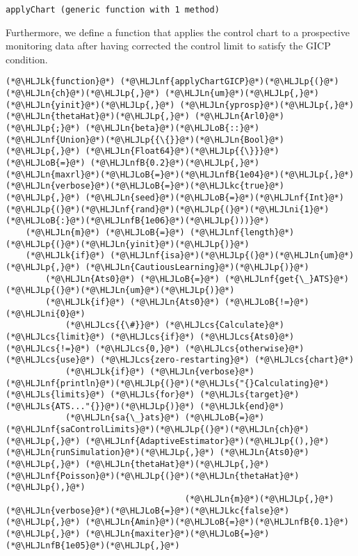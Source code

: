 \documentclass[12pt,a4paper]{article}
\newcommand{\HLJLk}[1]{\textcolor[RGB]{148,91,176}{\textbf{#1}}}
\newcommand{\HLJLkc}[1]{\textcolor[RGB]{59,151,46}{\textit{#1}}}
\newcommand{\HLJLn}[1]{#1}
\newcommand{\HLJLnf}[1]{\textcolor[RGB]{66,102,213}{#1}}
\newcommand{\HLJLs}[1]{\textcolor[RGB]{201,61,57}{#1}}
\newcommand{\HLJLnfB}[1]{\textcolor[RGB]{59,151,46}{#1}}
\newcommand{\HLJLni}[1]{\textcolor[RGB]{59,151,46}{#1}}
\newcommand{\HLJLoB}[1]{\textcolor[RGB]{102,102,102}{\textbf{#1}}}
\newcommand{\HLJLp}[1]{#1}
\newcommand{\HLJLcs}[1]{\textcolor[RGB]{153,153,119}{\textit{#1}}}
\begin{document}
\begin{lstlisting}
applyChart (generic function with 1 method)
\end{lstlisting}


Furthermore, we define a function that applies the control chart to a prospective monitoring data after having corrected the control limit to satisfy the GICP condition.


\begin{lstlisting}
(*@\HLJLk{function}@*) (*@\HLJLnf{applyChartGICP}@*)(*@\HLJLp{(}@*)(*@\HLJLn{ch}@*)(*@\HLJLp{,}@*) (*@\HLJLn{um}@*)(*@\HLJLp{,}@*) (*@\HLJLn{yinit}@*)(*@\HLJLp{,}@*) (*@\HLJLn{yprosp}@*)(*@\HLJLp{,}@*) (*@\HLJLn{thetaHat}@*)(*@\HLJLp{,}@*) (*@\HLJLn{Arl0}@*)(*@\HLJLp{;}@*) (*@\HLJLn{beta}@*)(*@\HLJLoB{::}@*)(*@\HLJLnf{Union}@*)(*@\HLJLp{{\{}}@*)(*@\HLJLn{Bool}@*)(*@\HLJLp{,}@*) (*@\HLJLn{Float64}@*)(*@\HLJLp{{\}}}@*) (*@\HLJLoB{=}@*) (*@\HLJLnfB{0.2}@*)(*@\HLJLp{,}@*) (*@\HLJLn{maxrl}@*)(*@\HLJLoB{=}@*)(*@\HLJLnfB{1e04}@*)(*@\HLJLp{,}@*) (*@\HLJLn{verbose}@*)(*@\HLJLoB{=}@*)(*@\HLJLkc{true}@*)(*@\HLJLp{,}@*) (*@\HLJLn{seed}@*)(*@\HLJLoB{=}@*)(*@\HLJLnf{Int}@*)(*@\HLJLp{(}@*)(*@\HLJLnf{rand}@*)(*@\HLJLp{(}@*)(*@\HLJLni{1}@*)(*@\HLJLoB{:}@*)(*@\HLJLnfB{1e06}@*)(*@\HLJLp{)))}@*)
    (*@\HLJLn{m}@*) (*@\HLJLoB{=}@*) (*@\HLJLnf{length}@*)(*@\HLJLp{(}@*)(*@\HLJLn{yinit}@*)(*@\HLJLp{)}@*)
    (*@\HLJLk{if}@*) (*@\HLJLnf{isa}@*)(*@\HLJLp{(}@*)(*@\HLJLn{um}@*)(*@\HLJLp{,}@*) (*@\HLJLn{CautiousLearning}@*)(*@\HLJLp{)}@*)
        (*@\HLJLn{Ats0}@*) (*@\HLJLoB{=}@*) (*@\HLJLnf{get{\_}ATS}@*)(*@\HLJLp{(}@*)(*@\HLJLn{um}@*)(*@\HLJLp{)}@*)
        (*@\HLJLk{if}@*) (*@\HLJLn{Ats0}@*) (*@\HLJLoB{!=}@*) (*@\HLJLni{0}@*)
            (*@\HLJLcs{{\#}}@*) (*@\HLJLcs{Calculate}@*) (*@\HLJLcs{limit}@*) (*@\HLJLcs{if}@*) (*@\HLJLcs{Ats0}@*) (*@\HLJLcs{!=}@*) (*@\HLJLcs{0,}@*) (*@\HLJLcs{otherwise}@*) (*@\HLJLcs{use}@*) (*@\HLJLcs{zero-restarting}@*) (*@\HLJLcs{chart}@*)
            (*@\HLJLk{if}@*) (*@\HLJLn{verbose}@*) (*@\HLJLnf{println}@*)(*@\HLJLp{(}@*)(*@\HLJLs{"{}Calculating}@*) (*@\HLJLs{limits}@*) (*@\HLJLs{for}@*) (*@\HLJLs{target}@*) (*@\HLJLs{ATS..."{}}@*)(*@\HLJLp{)}@*) (*@\HLJLk{end}@*)
            (*@\HLJLn{sa{\_}ats}@*) (*@\HLJLoB{=}@*) (*@\HLJLnf{saControlLimits}@*)(*@\HLJLp{(}@*)(*@\HLJLn{ch}@*)(*@\HLJLp{,}@*) (*@\HLJLnf{AdaptiveEstimator}@*)(*@\HLJLp{(),}@*) (*@\HLJLn{runSimulation}@*)(*@\HLJLp{,}@*) (*@\HLJLn{Ats0}@*)(*@\HLJLp{,}@*) (*@\HLJLn{thetaHat}@*)(*@\HLJLp{,}@*) (*@\HLJLnf{Poisson}@*)(*@\HLJLp{(}@*)(*@\HLJLn{thetaHat}@*)(*@\HLJLp{),}@*)
                                    (*@\HLJLn{m}@*)(*@\HLJLp{,}@*) (*@\HLJLn{verbose}@*)(*@\HLJLoB{=}@*)(*@\HLJLkc{false}@*)(*@\HLJLp{,}@*) (*@\HLJLn{Amin}@*)(*@\HLJLoB{=}@*)(*@\HLJLnfB{0.1}@*)(*@\HLJLp{,}@*) (*@\HLJLn{maxiter}@*)(*@\HLJLoB{=}@*)(*@\HLJLnfB{1e05}@*)(*@\HLJLp{,}@*)

\end{lstlisting}
\end{document}
